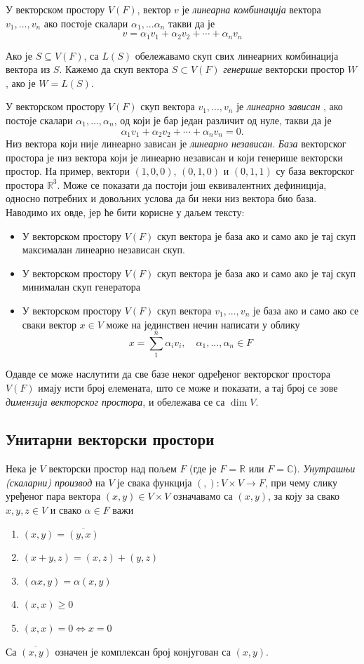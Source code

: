 \documentclass{report}
\theoremstyle{plain}
\theoremstyle{definition}
\begin{document}
У векторском простору $V(F)$, вектор $v$ је \emph{линеарна комбинација} вектора $v_1, ..., v_n$ ако постоје скалари $\alpha_1, ...\alpha_n$ такви да је $$v = \alpha_1 v_1+ \alpha_2 v_2+ \cdots+\alpha_n v_n$$

Ако је $S\subseteq V(F)$, са $L(S)$ обележавамо скуп свих линеарних комбинација вектора из $S$. Кажемо да скуп вектора $S\subset V(F)$ \emph{генерише} векторски простор $W$, ако је $W = L(S)$.


У векторском простору $V(F)$ скуп вектора $v_1, ...,v_n$ је \emph{линеарно зависан} , ако постоје скалари $\alpha_1, ...,\alpha_n$, од који је бар један различит од нуле, такви да је $$\alpha_1 v_1 + \alpha_2 v_2 + \cdots+\alpha_n v_n = 0.$$ Низ вектора који није линеарно зависан је \emph{линеарно независан}.
\emph{База} векторског простора је низ вектора који је линеарно независан и који генерише векторски простор.
На пример, вектори $(1, 0, 0)$, $(0, 1, 0)$ и $(0, 1, 1)$ су база векторског простора $\mathbb{R}^3$.
Може се показати да постоји још еквивалентних дефиниција, односно потребних и довољних услова да би неки низ вектора био база. Наводимо их овде, јер ће бити корисне у даљем тексту:
\begin{itemize}
  \item У векторском простору $V(F)$ скуп вектора је база ако и само ако је тај скуп максималан линеарно независан скуп.
  \item У векторском простору $V(F)$ скуп вектора је база ако и само ако је тај скуп минималан скуп генератора
  \item У векторском простору $V(F)$ скуп вектора $v_1, ..., v_n$ је база ако и само ако се сваки вектор $x\in V$ може на јединствен нечин написати у облику $$x = \sum_1^n\alpha_i v_i, \quad \alpha_1, ..., \alpha_n\in F$$
\end{itemize}
Одавде се може наслутити да све базе неког одређеног векторског простора $V(F)$ имају исти број елемената, што се може и показати, а тај број се зове \emph{димензија векторског простора}, и обележава се са $\operatorname{dim} V$.

\subsection{Унитарни векторски простори}

Нека је $V$ векторски простор над пољем $F$ (где је $F=\mathbb{R}$ или $F=\mathbb{C}$). \emph{Унутрашњи (скаларни) производ} на $V$ је свака функција $(,):V\times V\to F$, при чему слику уређеног пара вектора $(x, y)\in V\times V$ означавамо са $(x, y)$, за коју за свако $x, y, z\in V$ и свако $\alpha \in F$ важи
\begin{enumerate}
  \item $(x, y) = \overline{(y, x)}$
  \item $(x+y, z) = (x, z)+(y, z)$
  \item $(\alpha x, y) = \alpha (x, y)$
  \item $(x, x)\geq 0$
  \item $(x, x) = 0 \Leftrightarrow x=0$
\end{enumerate}
Са $\overline{(x, y)}$ означен је комплексан број конјугован са $(x, y)$.
\end{document}
